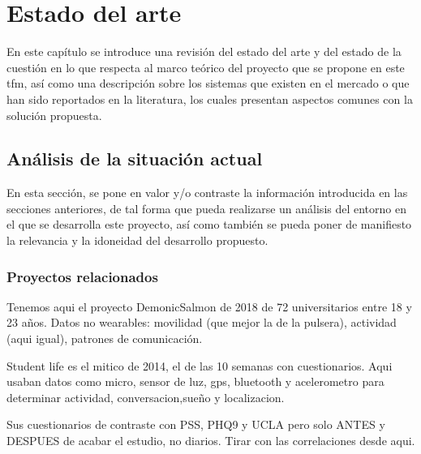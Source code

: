 \chapter{Estado del arte}
\label{chapter:estado_arte}



En este capítulo se introduce una revisión del estado del arte y del estado de la cuestión en lo que respecta al marco teórico del proyecto que se propone en este \gls{tfm}, así como una descripción sobre los sistemas que existen en el mercado o que han sido reportados en la literatura, los cuales presentan aspectos comunes con la solución propuesta.


\section{Análisis de la situación actual}

En esta sección, se pone en valor y/o contraste la información introducida en las secciones anteriores, de tal forma que pueda realizarse un análisis del entorno en el que se desarrolla este proyecto, así como también se pueda poner de manifiesto la relevancia y la idoneidad del desarrollo propuesto. 



\subsection{Proyectos relacionados}

Tenemos aqui el proyecto DemonicSalmon de 2018 de 72 universitarios entre 18 y 23 años. Datos no wearables: movilidad (que mejor la de la pulsera), actividad (aqui igual), patrones de comunicación.

Student life es el mitico de 2014, el de las 10 semanas con cuestionarios. Aqui usaban datos como micro, sensor de luz, gps, bluetooth y acelerometro para determinar actividad, conversacion,sueño y localizacion.

Sus cuestionarios de contraste con PSS, PHQ9 y UCLA pero solo ANTES y DESPUES de acabar el estudio, no diarios. Tirar con las correlaciones desde aqui.

